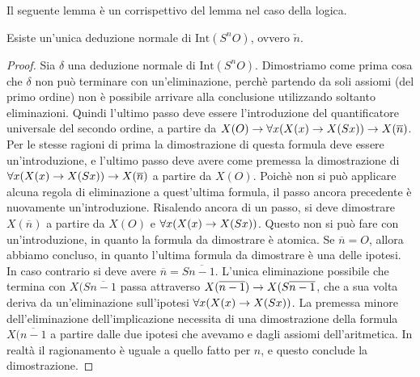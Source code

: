 \documentclass[]{marticle}
\begin{document}
Il seguente lemma \`e un corrispettivo del lemma  nel caso della
logica.
\begin{block}[Lemma]
    Esiste un'unica deduzione normale di $\text{Int} (S^nO)$, ovvero
    $\check{n}$.
\end{block}
\begin{proof}
    Sia $\delta$ una deduzione normale di $\text{Int} (S^nO)$. Dimostriamo
    come prima cosa che $\delta$ non pu\`o terminare con un'eliminazione,
    perch\`e partendo da soli assiomi (del primo ordine) non \`e possibile
    arrivare alla conclusione utilizzando soltanto eliminazioni. Quindi l'ultimo
    passo deve essere l'introduzione del quantificatore universale del secondo
    ordine, a partire da $X(O) \rightarrow \forall x (X(x)\rightarrow X(Sx)) \rightarrow
    X(\overline{n})$. Per le stesse ragioni di prima la dimostrazione di questa
    formula deve essere un'introduzione, e l'ultimo passo deve avere come
    premessa la dimostrazione di $\forall x (X(x)\rightarrow X(Sx)) \rightarrow
    X(\overline{n})$ a partire da $X(O)$. Poich\`e non si pu\`o applicare alcuna
    regola di eliminazione a quest'ultima formula, il passo ancora precedente
    \`e nuovamente un'introduzione. Risalendo ancora di un passo, si deve
    dimostrare $X(\overline{n})$ a partire da $X(O)$ e $\forall x (X(x)\rightarrow
    X(Sx))$. Questo non si pu\`o fare con un'introduzione, in quanto la formula
    da dimostrare \`e atomica. Se $\overline{n} = O$, allora abbiamo concluso,
    in quanto l'ultima formula da dimostrare \`e una delle ipotesi. In caso
    contrario si deve avere $\overline{n} = S \overline{n-1}$. L'unica
    eliminazione possibile che termina con $X(S\overline{n-1}$ passa attraverso
    $X(\overline{n-1}) \rightarrow X(S \overline{n-1}$, che a sua volta deriva da
    un'eliminazione sull'ipotesi $\forall x(X(x)\rightarrow X(Sx))$. La premessa minore
    dell'eliminazione dell'implicazione necessita di una dimostrazione della
    formula $X(\overline{n-1}$ a partire dalle due ipotesi che avevamo e dagli
    assiomi dell'aritmetica. In realt\`a il ragionamento \`e uguale a quello
    fatto per $n$, e questo conclude la dimostrazione.
\end{proof}
\end{document}
